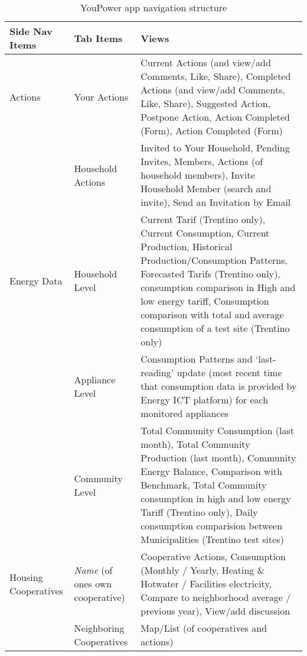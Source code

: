 \begin{longtable}{ p{3.5cm}  p{3.5cm} p{7.5cm}}
\caption{YouPower app navigation structure}\label{tab:app_nav}\\
\hline
\textbf{Side Nav Items}  &
\textbf{Tab Items}  &
\textbf{Views}  \\ \hline

Actions & Your Actions & Current Actions (and view/add Comments, Like, Share), Completed Actions (and view/add Comments, Like, Share), Suggested Action, Postpone Action, Action Completed (Form), Action Completed (Form) \\ \cline{2-3}
& Household Actions & Invited to Your Household, Pending Invites, Members, Actions (of household members), Invite Household Member (search and invite), Send an Invitation by Email \\ 
\hline

Energy Data  & Household Level  & Current Tarif (Trentino only), Current Consumption, Current Production, Historical Production/Consumption Patterns, Forecasted Tarifs (Trentino only), consumption comparison in High and low energy tariff, Consumption comparison with total and average consumption of a test site (Trentino only) \\  \cline{2-3}
& Appliance Level & Consumption Patterns and `last-reading' update (most recent time that consumption data is provided by Energy ICT platform) for each monitored appliances\\  \cline{2-3}
&  Community Level & Total Community Consumption (last month), Total Community Production (last month), Community Energy Balance, Comparison with Benchmark, Total Community consumption in high and low energy Tariff (Trentino only), Daily consumption comparision between Municipalities (Trentino test sites)\\  \hline

Housing Cooperatives & \textit{Name} (of ones own cooperative) & Cooperative Actions, Consumption (Monthly / Yearly, Heating \& Hotwater / Facilities electricity, Compare to neighborhood average / previous year), View/add discussion \\ \cline{2-3}
& Neighboring Cooperatives &  Map/List (of cooperatives and actions) \\  \hline



\end{longtable}
